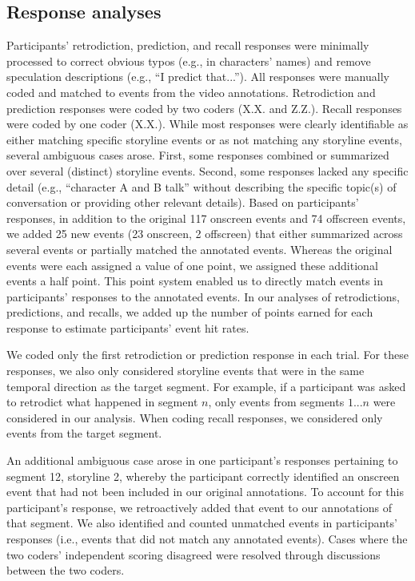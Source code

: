 \documentclass[10pt]{article}
\begin{document}
\subsection*{Response analyses}

Participants' retrodiction, prediction, and recall responses were minimally
processed to correct obvious typos (e.g., in characters’ names) and remove
speculation descriptions (e.g., ``I predict that...''). All responses were
manually coded and matched to events from the video annotations. Retrodiction
and prediction responses were coded by two coders (X.X. and Z.Z.). Recall
responses were coded by one coder (X.X.). While most responses were clearly
identifiable as either matching specific storyline events or as not matching
any storyline events, several ambiguous cases arose. First, some responses
combined or summarized over several (distinct) storyline events. Second, some
responses lacked any specific detail (e.g., ``character A and B talk'' without
describing the specific topic(s) of conversation or providing other relevant
details). Based on participants' responses, in addition to the original 117
onscreen events and 74 offscreen events, we added 25 new events (23 onscreen, 2
offscreen) that either summarized across several events or partially matched
the annotated events. Whereas the original events were each assigned a value of
one point, we assigned these additional events a half point. This point system
enabled us to directly match events in participants' responses to the annotated
events. In our analyses of retrodictions, predictions, and recalls, we added up
the number of points earned for each response to estimate participants' event
hit rates.

We coded only the first retrodiction or prediction response in each trial. For
these responses, we also only considered storyline events that were in the same
temporal direction as the target segment. For example, if a participant was
asked to retrodict what happened in segment $n$, only events from segments
$1...n$ were considered in our analysis. When coding recall responses, we
considered only events from the target segment.

An additional ambiguous case arose in one participant's responses pertaining to
segment 12, storyline 2, whereby the participant correctly identified an
onscreen event that had not been included in our original annotations. To
account for this participant's response, we retroactively added that event to
our annotations of that segment. We also identified and counted unmatched
events in participants' responses (i.e., events that did not match any
annotated events). Cases where the two coders' independent scoring disagreed
were resolved through discussions between the two coders.
\end{document}
